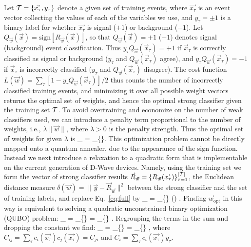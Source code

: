 \documentclass[.chapters/Higgs/.chapters/Higgs/main.tex]{subfiles}
\begin{document}
Let $\mathcal{T} = \{\vec{x_\tau}, y_\tau\}$ denote a given set of training events, where $\vec{x_\tau}$ is an event vector collecting the values of each of the variables we use, and $y_\tau =\pm 1$ is a binary label for whether $\vec{x_\tau}$ is signal ($+1$) or background ($-1$). Let $Q_{\vec{w}}(\vec{x}) = \mathrm{sign}[R_{\vec{w}}(\vec{x})]$, so that $Q_{\vec{w}}(\vec{x})=+1$ ($-1$) denotes signal (background) event classification. Thus $y_\tau Q_{\vec{w}}(\vec{x}_{\tau})=+1$ if $\vec{x}_{\tau}$ is correctly classified as signal or background ($y_\tau$ and $Q_{\vec{w}}(\vec{x}_{\tau})$ agree), and $y_\tau Q_{\vec{w}}(\vec{x}_{\tau})=-1$ if $\vec{x}_{\tau}$ is incorrectly classified ($y_\tau$ and $Q_{\vec{w}}(\vec{x}_{\tau})$ disagree). The cost function $L(\vec{w}) = \sum_{\tau} [1-y_\tau Q_{\vec{w}}(\vec{x}_{\tau})]/2$ thus counts the number of incorrectly classified training events, and minimizing it over all possible weight vectors returns the optimal set of weights, and hence the optimal strong classifier given the training set $\mathcal{T}$. To avoid overtraining and economize on the number of weak classifiers used, we can introduce a penalty term proportional to the number of weights, i.e., $\lambda \|\vec{w}\|$, where $\lambda>0$ is the penalty strength. Thus the optimal set of weights for given $\lambda$ is
\beq
{}_{} = _{\{\}} .
\label{eq:full}
\eeq
This optimization problem cannot be directly mapped onto a quantum annealer, due to the appearance of the sign function. 
Instead we next introduce a relaxation to a quadratic form that is implementable on the current generation of D-Wave devices. Namely, using the training set we form the vector of strong classifier results $\vec{R}_{\vec{w}} = \{R_{\vec{w}}(\vec{x_\tau})\}_{\tau=1}^{|\mathcal{T}|}$, the Euclidean distance measure $\delta(\vec{w})=\|\vec{y}-\vec{R}_{\vec{w}}\|^2$ between the strong classifier and the set of training labels, and replace Eq.~\eqref{eq:full} by
\beq
{}_{\min} = _{\{\}} \delta() .
\eeq
Finding $\vec{w}_{\mathrm{opt}}$ in this way is equivalent to solving a quadratic unconstrained binary optimization (QUBO) problem:
\beq
{}_{\min}  = _{\{\}} 
		=  _{\{\}}  .
\eeq
Regrouping the terms in the sum and dropping the constant we find:
\beq
{}_{\min}  = _{\{\}} 
 		 =  _{\{\}}  ,
		\label{eq:wopt1}
\eeq
where $C_{ij} = \sum_\tau c_i(\vec{x_\tau})c_j(\vec{x_\tau}) = C_{ji}$ and $C_i = \sum_\tau c_i(\vec{x_\tau}) y_\tau$. 
\end{document}
